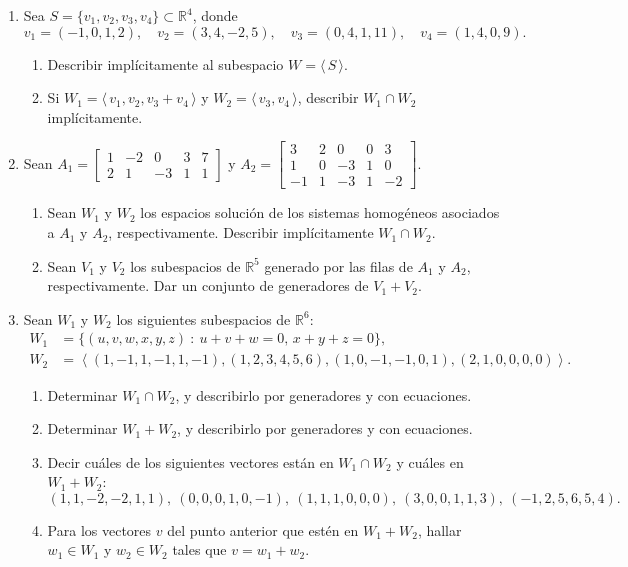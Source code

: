 \begin{enumerate}[resume, topsep=6pt, itemsep=.4cm]
    \item Sea  $S=\{v_1,v_2,v_3,v_4\}\subset\mathbb R^4$, donde
$$v_1=(-1,0,1,2), \quad v_2=(3,4,-2,5), \quad v_3=(0,4,1,11), \quad v_4=(1,4,0,9).$$
\begin{enumerate}
    \item  Describir implícitamente al subespacio  $W= \langle \, S\, \rangle$.
    \item Si $W_1 = \langle \, v_1,v_2,v_3+v_4\, \rangle $ y $W_2 = \langle \, v_3,v_4\, \rangle $,
    describir $W_1\cap W_2$ implícitamente.
\end{enumerate}


\item\label{matrices} Sean
    $
    A_1=\begin{bmatrix}
    1&-2&0&3&7\\
    2&1&-3&1&1
    \end{bmatrix}$ y $A_2=\begin{bmatrix}
    3&2&0&0&3\\
    1&0&-3&1&0 \\
    -1&1&-3&1&-2
    \end{bmatrix}
    $.
    
    \begin{enumerate}
    \item Sean $W_1$ y $W_2$ los espacios solución de los sistemas
    homogéneos asociados a $A_1$ y $A_2$, respectivamente.  Describir implícitamente $W_1\cap W_2$.
    \item Sean $V_1$ y $V_2$ los subespacios de $\mathbb{R}^5$ generado por las filas de $A_1$ y $A_2$, respectivamente. Dar un conjunto de generadores de $V_1+V_2$.
    \end{enumerate}


\item\label{todo} Sean $W_1$ y $W_2$ los siguientes subespacios de $\mathbb{R}^6$:
    \begin{align*}
    W_1 &= \{ (u,v,w,x,y,z)\ : \ u+v+w=0,\, x+y+z=0\},  \\
    W_2 &= \left\langle{(1,-1,1,-1,1,-1),(1,2,3,4,5,6),(1,0,-1,-1,0,1),(2,1,0,0,0,0)}\right\rangle.
    \end{align*}
    \begin{enumerate}
        \item  Determinar $W_1 \cap W_2$, y describirlo por generadores y con ecuaciones.
        \item  Determinar $W_1+W_2$, y describirlo por generadores y con ecuaciones.
        \item  Decir cuáles de los siguientes vectores están en $W_1\cap W_2$ y cuáles en $W_1+W_2$:
        \[ (1,1,-2,-2,1,1),\ (0,0,0,1,0,-1),\ (1,1,1,0,0,0),\ (3,0,0,1,1,3),\ (-1,2,5,6,5,4). \]
        \item Para los vectores $v$ del punto anterior que estén en $W_1+W_2$,  hallar $w_1\in W_1$ y $w_2\in W_2$ tales que $v=w_1+w_2$.


\end{enumerate}
\end{enumerate}
